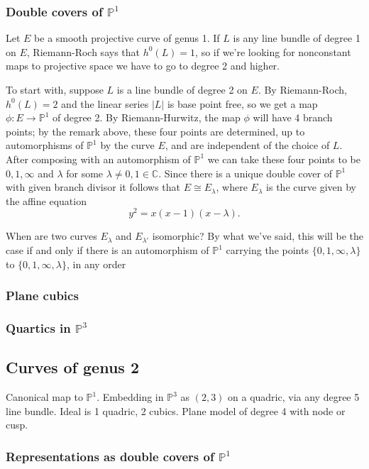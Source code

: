 \documentclass[12pt, leqno]{article}
\def\CC{{\mathbb C}}
\def\PP{{\mathbb P}}
\begin{document}
\subsubsection{Double covers of $\PP^1$}

Let $E$ be a smooth projective curve of genus 1. If $L$ is any line bundle of degree 1 on $E$, Riemann-Roch says that $h^0(L) = 1$, so if we're looking for nonconstant maps to projective space we have to go to degree 2 and higher.

To start with, suppose $L$ is a line bundle of degree 2 on $E$. By Riemann-Roch, $h^0(L) = 2$ and the linear series $|L|$ is base point free, so we get a map $\phi : E \to \PP^1$ of degree 2. By Riemann-Hurwitz, the map $\phi$ will have 4 branch points; by the remark above, these four points are determined, up to automorphisms of $\PP^1$ by the curve $E$, and are independent of the choice of $L$.
After composing with an automorphism of $\PP^1$ we can take these four points to be $0, 1, \infty$ and $\lambda$ for some $\lambda \neq 0, 1 \in \CC$. Since there is a unique double cover of $\PP^1$ with given branch divisor  it follows that $E \cong E_\lambda$, where $E_\lambda$ is the curve given by the affine equation
$$
y^2 = x(x-1)(x-\lambda).
$$

When are two curves $E_\lambda$ and $E_{\lambda'}$ isomorphic? By what we've said, this will be the case if and only if there is an automorphism of $\PP^1$ carrying the points $\{0,1,\infty,\lambda\}$ to $\{0,1,\infty,\lambda\}$, in any order

\subsubsection{Plane cubics}

\subsubsection{Quartics in $\PP^3$}

\subsection{Curves of genus 2}

Canonical map to $\PP^1$. Embedding in $\PP^3$ as $(2,3)$ on a quadric, via any degree 5 line bundle. Ideal is 1 quadric, 2 cubics.
Plane model of degree 4 with node or cusp.

\subsubsection{Representations as double covers of $\PP^1$}
\end{document}
